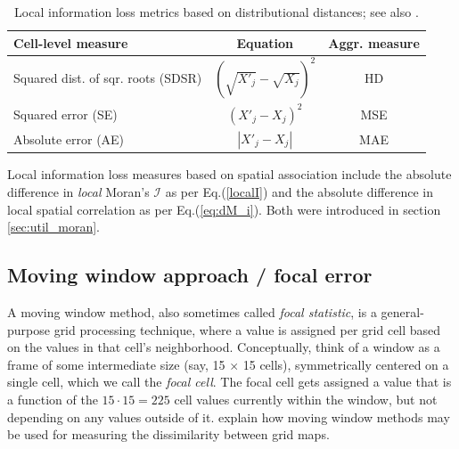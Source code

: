 \begin{table}[H]
    \centering
    \begin{tabular}{l c c}
    \hline
    Cell-level measure & Equation & Aggr. measure \\
    \hline
        \rule{0pt}{18pt} Squared dist. of sqr. roots (SDSR) &  $\left(\sqrt{X'_j} - \sqrt{X_j}\right)^2$ & HD \\
        \rule{0pt}{18pt} Squared error (SE) & $\left(X'_j - X_j\right)^2$ & MSE  \\
        \rule{0pt}{18pt} Absolute error (AE) & $\left|X'_j - X_j\right|$ & MAE  \\
        \hline
    \end{tabular}
    \caption{Local information loss metrics based on distributional distances; see also \citet{AntalEtAl2017}.}
    \label{tab:util_cellLVL}
\end{table}

Local information loss measures based on spatial association include the absolute difference in \emph{local} Moran's $\mathcal{I}$ as per Eq.(\ref{localI}) and the absolute difference in local spatial correlation as per Eq.(\ref{eq:dM_i}). Both were introduced in section \ref{sec:util_moran}.

\subsection{Moving window approach / focal error} \label{sec:util_LOC_mw}

A moving window method, also sometimes called \emph{focal statistic}, is a general-purpose grid processing technique, where a value is assigned per grid cell based on the values in that cell's neighborhood. Conceptually, think of a window as a frame of some intermediate size (say, 15 $\times$ 15 cells), symmetrically centered on a single cell, which we call the \emph{focal cell}. The focal cell gets assigned a value that is a function of the $15 \cdot 15 = 225$ cell values currently within the window, but not depending on any values outside of it. \citet{KuhnertEtAl2005} explain how moving window methods may be used for measuring the dissimilarity between grid maps.


